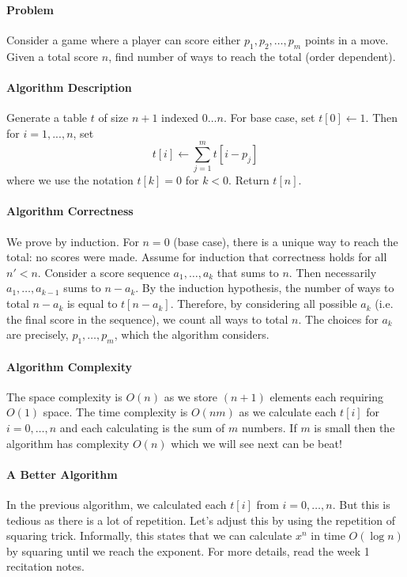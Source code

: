 \documentclass[10pt]{article}
\theoremstyle{plain}
\theoremstyle{definition}
\numberwithin{equation}{section}
\numberwithin{figure}{section}
\begin{document}
\paragraph{Problem} Consider a game where a player can score either $p_1, p_2, \ldots, p_m$ points in a move. Given a total score $n$, find number of ways to reach the total (order dependent).

\paragraph{Algorithm Description} Generate a table $t$ of size $n + 1$ indexed $0 \ldots n$. For base case, set $t[0] \leftarrow 1$. Then for $i = 1, ..., n$, set
\begin{equation}
t[i] \leftarrow \sum_{j = 1}^m t[i - p_j]
\end{equation}
where we use the notation $t[k] = 0$ for $k < 0$. Return $t[n]$.

\paragraph{Algorithm Correctness} We prove by induction. For $n = 0$ (base case), there is a unique way to reach the total: no scores were made. Assume for induction that correctness holds for all $n' < n$. Consider a score sequence $a_1, \ldots, a_k$ that sums to $n$. Then necessarily $a_1, \ldots, a_{k-1}$ sums to $n - a_k$. By the induction hypothesis, the number of ways to total $n - a_k$ is equal to $t[n - a_k]$. Therefore, by considering all possible $a_k$ (i.e. the final score in the sequence), we count all ways to total $n$. The choices for $a_k$ are precisely, $p_1, \ldots, p_m$, which the algorithm considers.

\paragraph{Algorithm Complexity} The space complexity is $O(n)$ as we store $(n + 1)$ elements each requiring $O(1)$ space. The time complexity is $O(nm)$ as we calculate each $t[i]$ for $i = 0, \ldots, n$ and each calculating is the sum of $m$ numbers. If $m$ is small then the algorithm has complexity $O(n)$ which we will see next can be beat!


\paragraph{A Better Algorithm} In the previous algorithm, we calculated each $t[i]$ from $i = 0, \ldots, n$. But this is tedious as there is a lot of repetition. Let's adjust this by using the repetition of squaring trick. Informally, this states that we can calculate $x^n$ in time $O(\log n)$ by squaring until we reach the exponent. For more details, read the week 1 recitation notes. \\
\end{document}
